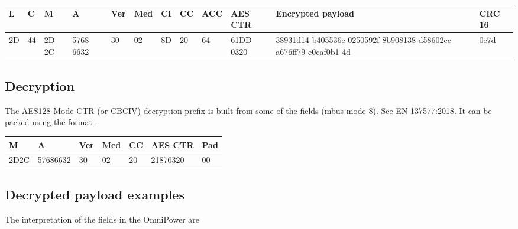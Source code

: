\documentclass[letterpaper,10pt,english]{sphinxmanual}
\begin{document}
\begin{savenotes}\sphinxattablestart
\centering
\begin{tabulary}{\linewidth}[t]{|T|T|T|T|T|T|T|T|T|T|T|T|}
\hline
\sphinxstyletheadfamily 
L
&\sphinxstyletheadfamily 
C
&\sphinxstyletheadfamily 
M
&\sphinxstyletheadfamily 
A
&\sphinxstyletheadfamily 
Ver
&\sphinxstyletheadfamily 
Med
&\sphinxstyletheadfamily 
CI
&\sphinxstyletheadfamily 
CC
&\sphinxstyletheadfamily 
ACC
&\sphinxstyletheadfamily 
AES CTR
&\sphinxstyletheadfamily 
Encrypted payload
&\sphinxstyletheadfamily 
CRC 16
\\
\hline
2D
&
44
&
2D 2C
&
5768 6632
&
30
&
02
&
8D
&
20
&
64
&
61DD 0320
&
38931d14 b405536e 0250592f 8b908138 d58602ec a676ff79 e0caf0b1 4d
&
0e7d
\\
\hline
\end{tabulary}
\par
\sphinxattableend\end{savenotes}


\subsection{Decryption}
\label{\detokenize{omnipower:decryption}}
The AES\sphinxhyphen{}128 Mode CTR (or CBC\sphinxhyphen{}IV) decryption prefix is built from some of the fields (m\sphinxhyphen{}bus mode 8). See EN 13757\sphinxhyphen{}7:2018.
It can be packed using the format .


\begin{savenotes}\sphinxattablestart
\centering
\begin{tabulary}{\linewidth}[t]{|T|T|T|T|T|T|T|}
\hline
\sphinxstyletheadfamily 
M
&\sphinxstyletheadfamily 
A
&\sphinxstyletheadfamily 
Ver
&\sphinxstyletheadfamily 
Med
&\sphinxstyletheadfamily 
CC
&\sphinxstyletheadfamily 
AES CTR
&\sphinxstyletheadfamily 
Pad
\\
\hline
2D2C
&
57686632
&
30
&
02
&
20
&
21870320
&
00
\\
\hline
\end{tabulary}
\par
\sphinxattableend\end{savenotes}


\subsection{Decrypted payload examples}
\label{\detokenize{omnipower:decrypted-payload-examples}}
The interpretation of the fields in the OmniPower are
\end{document}
